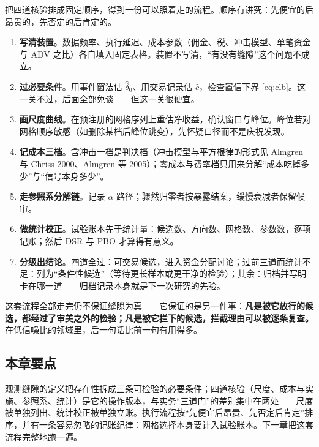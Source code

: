把四道核验排成固定顺序，得到一份可以照着走的流程。顺序有讲究：先便宜的后昂贵的，先否定的后肯定的。

\begin{enumerate}
  \item \textbf{写清装置}。数据频率、执行延迟、成本参数（佣金、税、冲击模型、单笔资金与 ADV 之比）各自填入固定表格。装置不写清，“有没有缝隙”这个问题不成立。
  \item \textbf{过必要条件}。用事件窗法估 $\hat\delta_0$、用交易记录估 $\hat c$，检查置信下界 \eqref{eq:clb}。这一关不过，后面全部免谈——但这一关很便宜。
  \item \textbf{画尺度曲线}。在预注册的网格序列上重估净收益，确认窗口与峰位。峰位若对网格顺序敏感（如删除某档后峰位跳变），先怀疑口径而不是庆祝发现。
  \item \textbf{记成本三档}。含冲击一档是判决档（冲击模型与平方根律的形式见 Almgren 与 Chriss 2000\cite{almgrenchriss2000}、Almgren 等 2005\cite{almgren2005}）；零成本与费率档只用来分解“成本吃掉多少”与“信号本身多少”。
  \item \textbf{走参照系分解链}。记录 $\alpha$ 路径；骤然归零者按暴露结案，缓慢衰减者保留候审。
  \item \textbf{做统计校正}。试验账本先于统计量：候选数、方向数、网格数、参数数，逐项记账；然后 DSR 与 PBO 才算得有意义。
  \item \textbf{分级出结论}。四道全过：可交易候选，进入资金分配讨论；过前三道而统计不足：列为“条件性候选”（等待更长样本或更干净的检验）；其余：归档并写明卡在哪一道——归档记录本身就是下一次研究的先验。
\end{enumerate}

这套流程全部走完仍不保证缝隙为真——它保证的是另一件事：\textbf{凡是被它放行的候选，都经过了审美之外的检验；凡是被它拦下的候选，拦截理由可以被逐条复查。}在低信噪比的领域里，后一句话比前一句有用得多。

\subsection{本章要点}

观测缝隙的定义把存在性拆成三条可检验的必要条件；四道核验（尺度、成本与实施、参照系、统计）是它的操作版本，与实务“三道门”的差别集中在两处——尺度被单独列出、统计校正被单独立账。执行流程按“先便宜后昂贵、先否定后肯定”排序，并有一条容易忽略的记账纪律：网格选择本身要计入试验账本。下一章把这套流程完整地跑一遍。